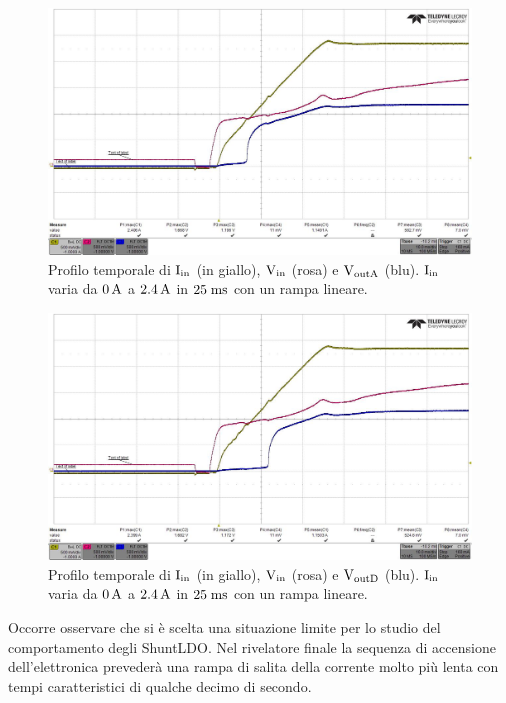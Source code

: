 \begin{figure}
\centering
\includegraphics[width=.9\textwidth]{Immagini/rd-powup-dir6}
\caption{Profilo temporale di $\mathrm{I_{in}}$ (in giallo), $\mathrm{V_{in}}$ (rosa) e $\mathrm{V_{outA}}$ (blu). $\mathrm{I_{in}}$ varia da $0\rm \, A$ a $2.4\rm \, A$ in $25\; \rm m \rm s$ con un rampa lineare.}
\label{rd-powup-dir6}
\end{figure}

\begin{figure}
\centering
\includegraphics[width=.9\textwidth]{Immagini/rd-powup-dir7}
\caption{Profilo temporale di $\mathrm{I_{in}}$ (in giallo), $\mathrm{V_{in}}$ (rosa) e $\mathrm{V_{outD}}$ (blu). $\mathrm{I_{in}}$ varia da $0\rm \, A$ a $2.4\rm \, A$ in $25\; \rm m \rm s$ con un rampa lineare.}
\label{rd-powup-dir7}
\end{figure}

Occorre osservare che si \`e scelta una situazione limite per lo studio del comportamento degli ShuntLDO. Nel rivelatore finale la sequenza di accensione dell'elettronica preveder\`a una rampa di salita della corrente molto pi\`u lenta con tempi caratteristici di qualche decimo di secondo.  

